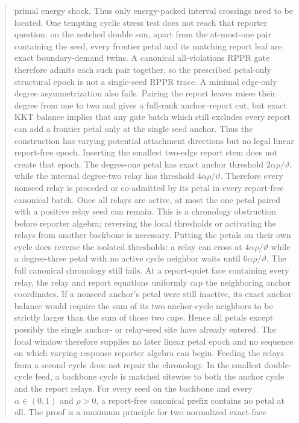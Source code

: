 \documentclass[11pt]{article}
\begin{document}
\begin{abstract}
primal energy shock.  Thus only energy-packed interval crossings need to be
located.  One tempting cyclic stress test does not reach that reporter
question: on the notched double sun, apart from the at-most-one pair containing
the seed, every frontier petal and its matching report leaf are exact
boundary-demand twins.  A canonical all-violations RPPR gate therefore admits
each such pair together, so the prescribed petal-only structural epoch is not
a single-seed RPPR trace.  A minimal edge-only degree asymmetrization also
fails.  Pairing the report leaves raises their degree from one to two and gives
a full-rank anchor--report cut, but exact KKT balance implies that any gate
batch which still excludes every report can add a frontier petal only at the
single seed anchor.  Thus the construction has varying potential attachment
directions but no legal linear report-free epoch.
Inserting the smallest two-edge report stem does not create that epoch.  The
degree-one petal has exact anchor threshold $2\alpha\rho/\vartheta$, while
the internal degree-two relay has threshold $4\alpha\rho/\vartheta$.
Therefore every nonseed relay is preceded or co-admitted by its petal in every
report-free canonical batch.  Once all relays are active, at most the one
petal paired with a positive relay seed can remain.  This is a chronology
obstruction before reporter algebra; reversing the local thresholds or
activating the relays from another backbone is necessary.
Putting the petals on their own cycle does reverse the isolated thresholds:
a relay can cross at $4\alpha\rho/\vartheta$ while a degree-three petal with
no active cycle neighbor waits until $6\alpha\rho/\vartheta$.  The full
canonical chronology still fails.  At a report-quiet face containing every
relay, the relay and report equations uniformly cap the neighboring anchor
coordinates.  If a nonseed anchor's petal were still inactive, its exact
anchor balance would require the sum of its two anchor-cycle neighbors to be
strictly larger than the sum of those two caps.  Hence all petals except
possibly the single anchor- or relay-seed site have already entered.  The
local window therefore supplies no later linear petal epoch and no sequence
on which varying-response reporter algebra can begin.
Feeding the relays from a second cycle does not repair the chronology.  In the
smallest double-cycle feed, a backbone cycle is matched sitewise to both the
anchor cycle and the report relays.  For every seed on the backbone and every
$\alpha\in(0,1)$ and $\rho>0$, a report-free canonical prefix contains no
petal at all.  The proof is a maximum principle for two normalized exact-face

\end{abstract}
\end{document}
